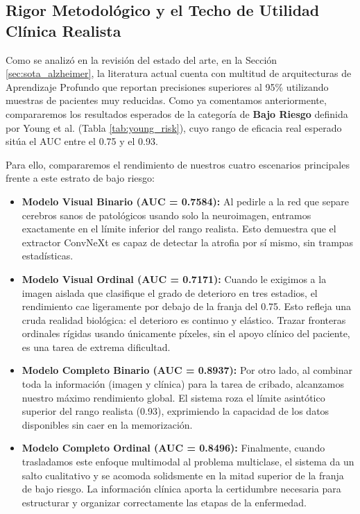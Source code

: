 \documentclass[12pt, oneside, english, spanish]{book}
\begin{document}
\subsection{Rigor Metodológico y el Techo de Utilidad Clínica Realista} \label{subsec:disc_rigor_techo}

Como se analizó en la revisión del estado del arte, en la Sección \ref{sec:sota_alzheimer}, la literatura actual cuenta con multitud de arquitecturas de Aprendizaje Profundo que reportan precisiones superiores al 95\% utilizando muestras de pacientes muy reducidas. Como ya comentamos anteriormente, compararemos los resultados esperados de la categoría de \textbf{Bajo Riesgo} definida por Young et al. (Tabla \ref{tab:young_risk}), cuyo rango de eficacia real esperado sitúa el AUC entre el 0.75 y el 0.93.

Para ello, compararemos el rendimiento de nuestros cuatro escenarios principales frente a este estrato de bajo riesgo:

\begin{itemize}
	\item \textbf{Modelo Visual Binario (AUC = 0.7584):} Al pedirle a la red que separe cerebros sanos de patológicos usando solo la neuroimagen, entramos exactamente en el límite inferior del rango realista. Esto demuestra que el extractor ConvNeXt es capaz de detectar la atrofia por sí mismo, sin trampas estadísticas.
	\item \textbf{Modelo Visual Ordinal (AUC = 0.7171):} Cuando le exigimos a la imagen aislada que clasifique el grado de deterioro en tres estadios, el rendimiento cae ligeramente por debajo de la franja del 0.75. Esto refleja una cruda realidad biológica: el deterioro es continuo y elástico. Trazar fronteras ordinales rígidas usando únicamente píxeles, sin el apoyo clínico del paciente, es una tarea de extrema dificultad.
	\item \textbf{Modelo Completo Binario (AUC = 0.8937):} Por otro lado, al combinar toda la información (imagen y clínica) para la tarea de cribado, alcanzamos nuestro máximo rendimiento global. El sistema roza el límite asintótico superior del rango realista (0.93), exprimiendo la capacidad de los datos disponibles sin caer en la memorización.
	\item \textbf{Modelo Completo Ordinal (AUC = 0.8496):} Finalmente, cuando trasladamos este enfoque multimodal al problema multiclase, el sistema da un salto cualitativo y se acomoda solidsmente en la mitad superior de la franja de bajo riesgo. La información clínica aporta la certidumbre necesaria para estructurar y organizar correctamente las etapas de la enfermedad.
\end{itemize}
\end{document}
